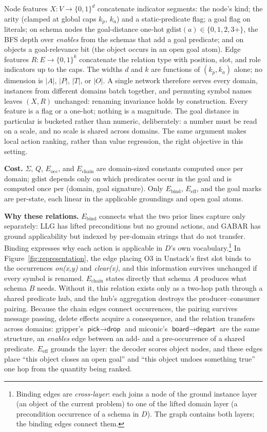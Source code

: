 \documentclass{article} %
\begin{document}
Node features $X : V \to \{0,1\}^{d}$ concatenate indicator segments: the
node's kind; the arity (clamped at global caps $k_p$, $k_a$) and a
static-predicate flag; a goal flag on literals; on schema nodes the
goal-distance one-hot $\mathrm{gdist}(a) \in \{0, 1, 2, 3{+}\}$, the BFS
depth over \textit{enables} from the schemas that add a goal predicate; and
on objects a goal-relevance bit (the object occurs in an open goal atom).
Edge features $R : E \to \{0,1\}^{k}$ concatenate the relation type with
position, slot, and role indicators up to the caps. The widths $d$ and $k$
are functions of $(k_p, k_a)$ alone; no dimension is $|A|$, $|P|$,
$|T|$, or $|O|$. A single network therefore serves every domain, instances from
different domains batch together, and permuting symbol names leaves
$(X, R)$ unchanged: renaming invariance holds by construction. Every
feature is a flag or a one-hot; nothing is a magnitude. The goal distance
in particular is bucketed rather than numeric, deliberately: a number must
be read on a scale, and no scale is shared across domains. The same
argument makes local action ranking, rather than value regression, the
right objective in this setting.

\textbf{Cost.} $\Sigma$, $Q$, $E_{\mathrm{occ}}$, and $E_{\mathrm{chain}}$
are domain-sized constants computed once per domain; $\mathrm{gdist}$
depends only on which predicates occur in the goal and is computed once per
(domain, goal signature). Only $E_{\mathrm{bind}}$, $E_{\mathrm{eff}}$, and
the goal marks are per-state, each linear in the applicable groundings and
open goal atoms.

\textbf{Why these relations.} $E_{\mathrm{bind}}$ connects what the two
prior lines capture only separately: LLG has lifted preconditions but no
ground actions, and GABAR has ground applicability but indexed by
per-domain strings that do not transfer. Binding expresses why each action is applicable in $D$'s own
vocabulary.\footnote{Binding edges are \emph{cross-layer}: each joins a
node of the ground instance layer (an object of the current problem) to one
of the lifted domain layer (a precondition occurrence of a schema in $D$).
The graph contains both layers; the binding edges connect them.} In
Figure~\ref{fig:representation}, the edge placing O3 in Unstack's first
slot binds to the occurrences \emph{on(x,y)} and \emph{clear(x)}, and this
information survives unchanged if every symbol is renamed.
$E_{\mathrm{chain}}$ states directly that schema $A$ produces what schema
$B$ needs. Without it, this relation exists only as a two-hop path through
a shared predicate hub, and the hub's aggregation destroys the
producer--consumer pairing. Because the chain edges connect occurrences,
the pairing survives message passing, delete effects acquire a consequence,
and the relation transfers across domains: gripper's
$\textsf{pick} \rightarrow \textsf{drop}$ and miconic's
$\textsf{board} \rightarrow \textsf{depart}$ are the same structure, an
\textit{enables} edge between an add- and a pre-occurrence of a shared
predicate. $E_{\mathrm{eff}}$ grounds the layer: the decoder scores object
nodes, and these edges place ``this object closes an open goal'' and ``this
object undoes something true'' one hop from the quantity being ranked.
\end{document}
